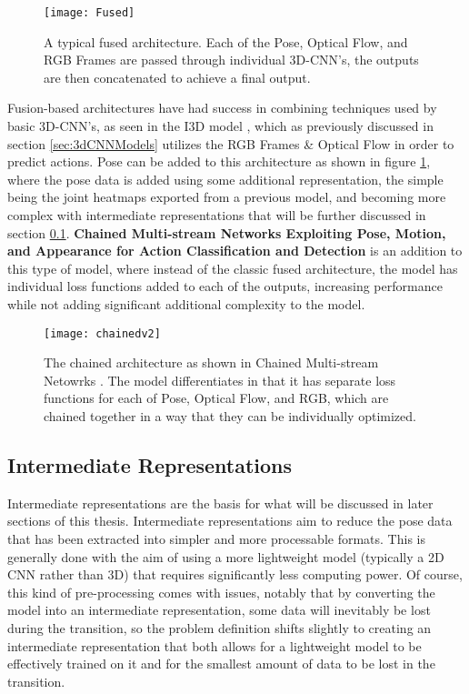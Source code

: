 \begin{figure}[ht]
	\texttt{[image: Fused]}
	\centering
	\caption{A typical fused architecture. Each of the Pose, Optical Flow, and RGB Frames are passed through individual 3D-CNN's, the outputs are then concatenated to achieve a final output.}
	\label{fig:fused}
\end{figure}

Fusion-based architectures have had success in combining techniques used by basic 3D-CNN's, as seen in the I3D model \cite{i3d}, which as previously discussed in section \ref{sec:3dCNNModels} utilizes the RGB Frames \& Optical Flow in order to predict actions. Pose can be added to this architecture as shown in figure \ref{fig:fused}, where the pose data is added using some additional representation, the simple being the joint heatmaps exported from a previous model, and becoming more complex with intermediate representations that will be further discussed in section \ref{sec:intermediate}. \textbf{Chained Multi-stream Networks Exploiting Pose, Motion, and Appearance for Action Classification and Detection} \cite{Chained} is an addition to this type of model, where instead of the classic fused architecture, the model has individual loss functions added to each of the outputs, increasing performance while not adding significant additional complexity to the model.

\begin{figure}[ht]
	\texttt{[image: chainedv2]}
	\centering
	\caption{The chained architecture as shown in Chained Multi-stream Netowrks \cite{Chained}. The model differentiates in that it has separate loss functions for each of Pose, Optical Flow, and RGB, which are chained together in a way that they can be individually optimized.}
	\label{fig:chained}
\end{figure}

\subsection{Intermediate Representations}
\label{sec:intermediate}

Intermediate representations are the basis for what will be discussed in later sections of this thesis. Intermediate representations aim to reduce the pose data that has been extracted into simpler and more processable formats. This is generally done with the aim of using a more lightweight model (typically a 2D CNN rather than 3D) that requires significantly less computing power. Of course, this kind of pre-processing comes with issues, notably that by converting the model into an intermediate representation, some data will inevitably be lost during the transition, so the problem definition shifts slightly to creating an intermediate representation that both allows for a lightweight model to be effectively trained on it and for the smallest amount of data to be lost in the transition.

